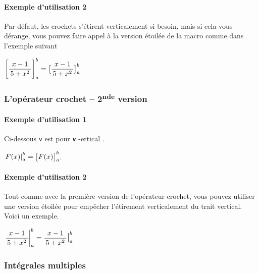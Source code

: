 \documentclass[12pt,a4paper]{article}
\theoremstyle{definition}
\newcommand\whyprefix[2]{%
	\textbf{\prefix{#1}}-#2%
}
\newcommand\prefix[1]{%
	\texttt{#1}%
}
\begin{document}


\paragraph{Exemple d'utilisation 2}

Par défaut, les crochets s'étirent verticalement si besoin, mais si cela vous dérange, vous pouvez faire appel à la version étoilée de la macro comme dans l'exemple suivant

\begin{latexex}
$\displaystyle
 \hook{\frac{x - 1}{5 + x^2}}{a}{b}
 = \hook*{\frac{x - 1}{5 + x^2}}{a}{b}$
\end{latexex}




\subsubsection{L'opérateur crochet -- 2\textsuperscript{nde} version}

\paragraph{Exemple d'utilisation 1}

Ci-dessous \prefix{v} est pour \whyprefix{v}{ertical}.

\begin{latexex}
$\vhook{F(x)}{a}{b}
 = \hook{F(x)}{a}{b}$.
\end{latexex}




\paragraph{Exemple d'utilisation 2}

Tout comme avec la première version de l'opérateur crochet, vous pouvez utiliser une version étoilée pour empêcher l'étirement verticalement du trait vertical. Voici un exemple.

\begin{latexex}
$\displaystyle
 \vhook{\frac{x - 1}{5 + x^2}}{a}{b}
 = \vhook*{\frac{x - 1}{5 + x^2}}{a}{b}$
\end{latexex}




\subsubsection{Intégrales multiples}
\end{document}
